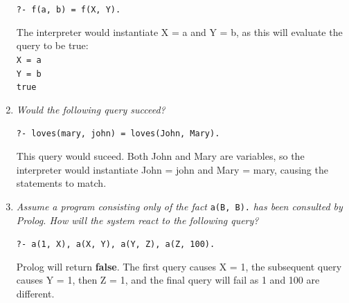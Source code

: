 \documentclass{report}
\newcommand{\code}[1]{\texttt{#1}}
\begin{document}
\begin{enumerate}[label=(\alph*)]
    \centerline{\code{?- f(a, b) = f(X, Y).}}
    
    The interpreter would instantiate X = a and Y = b, as this will evaluate the query to be true: \\
    \code{X = a} \\
    \code{Y = b} \\
    \code{true} \\

    \item \emph{Would the following query succeed?}
    
    \centerline{\code{?- loves(mary, john) = loves(John, Mary).}}

    This query would suceed. Both John and Mary are variables, so the interpreter would instantiate John = john and Mary = mary, causing the statements to match.

    \item \emph{Assume a program consisting only of the fact }  \code{a(B, B).} \emph{has been consulted by Prolog. How will the system react to the following query?}
    
    \centerline{\code{?- a(1, X), a(X, Y), a(Y, Z), a(Z, 100).}}

    Prolog will return \textbf{false}. The first query causes X = 1, the subsequent query causes Y = 1, then Z = 1, and the final query will fail as 1 and 100 are different.

\end{enumerate}
\end{document}
